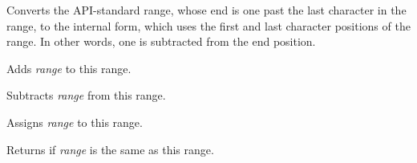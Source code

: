 Converts the API-standard range, whose end is one past the last character in the range,
to the internal form, which uses the first and last character positions of the range.
In other words, one is subtracted from the end position.

\label{wxrichtextrangeoperatorplus}


Adds {\it range} to this range.

\label{wxrichtextrangeoperatorminus}


Subtracts {\it range} from this range.

\label{wxrichtextrangeoperatorassign}


Assigns {\it range} to this range.

\label{wxrichtextrangeoperatorequal}


Returns \true if {\it range} is the same as this range.

